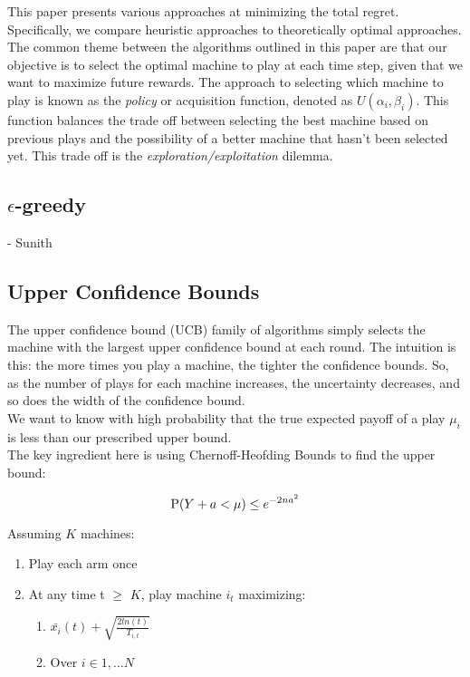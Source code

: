 \documentclass{article}
\begin{document}
This paper presents various approaches at minimizing the total regret. Specifically, we compare heuristic approaches to theoretically optimal approaches.\\

The common theme between the algorithms outlined in this paper are that our objective is to select the optimal machine to play at each time step, given that we want to maximize future rewards. The approach to selecting which machine to play is known as the \textit{policy} or acquisition function, denoted as $U(\alpha_i, \beta_i)$. This function balances the trade off between selecting the best machine based on previous plays and the possibility of a better machine that hasn't been selected yet. This trade off is the \textit{exploration/exploitation} dilemma.\\


\subsection{$\epsilon$-greedy}

- Sunith

\subsection{Upper Confidence Bounds}

The upper confidence bound (UCB) family of algorithms simply selects the machine with the largest upper confidence bound at each round.  The intuition is this: the more times you play a machine, the tighter the confidence bounds. So, as the number of plays for each machine increases, the uncertainty decreases, and so does the width of the confidence bound.\\

We want to know with high probability that the true expected payoff of a play $\mu_i$ is less than our prescribed upper bound.\\

The key ingredient here is using Chernoff-Heofding Bounds to find the upper bound:

$$\displaystyle \textup{P}(Y + a < \mu) \leq e^{-2na^2}$$

Assuming $K$ machines:

\begin{enumerate}
\item Play each arm once
\item At any time t $\ge$ $K$, play machine $i_t$ maximizing:
	\begin{enumerate}
		\item $\bar{x_{i}}(t) + \sqrt{\frac{2 ln (t)}{T_{i,t}}}$
		\item Over $i \in {1,...N}$ 
	\end{enumerate}
\end{enumerate}
\end{document}
